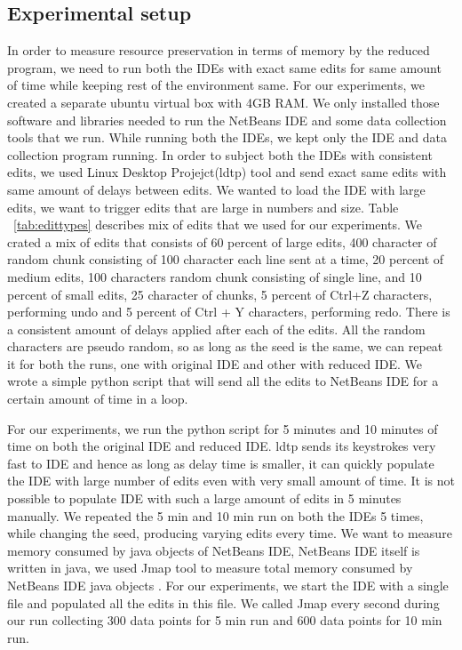 \subsection{Experimental setup}
In order to measure resource preservation in terms of memory by the reduced program, we need to run both the IDEs with exact same edits for same amount of time while keeping rest of the environment same. For our experiments, we created a separate ubuntu virtual box with 4GB RAM. We only installed those software and libraries needed to run the NetBeans IDE and some data collection tools that we run. While running both the IDEs, we kept only the IDE and data collection program running. In order to subject both the IDEs with consistent edits, we used Linux Desktop Projejct(ldtp) tool and send exact same edits with same amount of delays between edits. We wanted to load the IDE with large edits, we want to trigger edits that are large in numbers and size. Table ~\ref{tab:edittypes} describes mix of edits that we used for our experiments. We crated a mix of edits that consists of 60 percent of large edits, 400 character of random chunk consisting of 100 character each line sent at a time, 20 percent of medium edits, 100 characters random chunk consisting of single line, and 10 percent of small edits, 25 character of chunks, 5 percent of Ctrl+Z characters, performing undo and 5 percent of Ctrl + Y characters, performing redo. There is a consistent amount of delays applied after each of the edits. All the random characters are pseudo random, so as long as the seed is the same, we can repeat it for both the runs, one with original IDE and other with reduced IDE. We wrote a simple python script that will send all the edits to NetBeans IDE for a certain amount of time in a loop. 

For our experiments, we run the python script for 5 minutes and 10 minutes of time on both the original IDE and reduced IDE. ldtp sends its keystrokes very fast to IDE and hence as long as delay time is smaller, it can quickly populate the IDE with large number of edits even with very small amount of time. It is not possible to populate IDE with such a large amount of edits in 5 minutes manually. We repeated the 5 min and 10 min run on both the IDEs 5 times, while changing the seed, producing varying edits every time. We want to measure memory consumed by java objects of NetBeans IDE, NetBeans IDE itself is written in java, we used Jmap tool to measure total memory consumed by NetBeans IDE java objects \cite{jmap}. For our experiments, we start the IDE with a single file and populated all the edits in this file.  We called Jmap every second during our run collecting 300 data points for 5 min run and 600 data points for 10 min run. 

